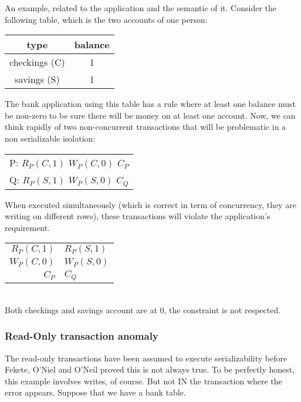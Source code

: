 \fi

An example\cite{write-skew}, related to the application and the semantic of it. Consider the following table, which is the two accounts of one person:

\begin{table}[H]
  \centering
  \begin{tabular}{ c | c }
    type & balance \\
        \hline
    checkings (C) & 1 \\
    savings (S) & 1 \\
  \end{tabular}
\end{table}

The bank application using this table has a rule where at least one balance must be non-zero to be sure there will be money on at least one account. Now, we can think rapidly of two non-concurrent transactions that will be problematic in a non serializable isolation:

\begin{table}[H]
  \centering
  \begin{tabular}{ c }
    P:   $R_P(C, 1)$ $W_P(C, 0)$ $C_P$ \\
    Q:   $R_P(S, 1)$ $W_P(S, 0)$ $C_Q$ \\
  \end{tabular}
\end{table}

When executed simultaneously (which is correct in term of concurrency, they are writing on different rows), these transactions will violate the application's requirement.

\begin{table}[H]
  \centering
  \begin{tabular}{ r l }
    $R_P(C, 1)$ & $R_P(S, 1)$ \\
    $W_P(C, 0)$ & $W_P(S, 0)$ \\
    $C_P$ & $C_Q$ \\
  \end{tabular}
  \\
  Both checkings and savings account are at 0, the constraint is not respected.
\end{table}

\subsubsection{Read-Only transaction anomaly}
\label{sec:ro-anomaly}

The read-only transactions have been assumed to execute serializability before Fekete, O'Niel and O'Neil proved this is not always true\cite{DBLP:journals/sigmod/FeketeOO04}.
To be perfectly honest, this example involves writes, of course. But not IN the transaction where the error appears. Suppose that we have a bank table.

